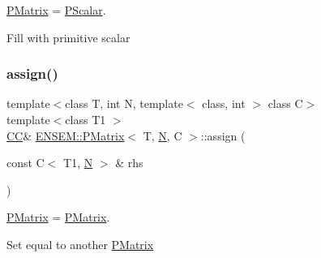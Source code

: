 \mbox{\hyperlink{classENSEM_1_1PMatrix}{P\+Matrix}} = \mbox{\hyperlink{classENSEM_1_1PScalar}{P\+Scalar}}. 

Fill with primitive scalar \mbox{\label{classENSEM_1_1PMatrix_ac3c0e489c8c8011edc4ea93477176b84}} 
\subsubsection{\texorpdfstring{assign()}{assign()}\hspace{0.1cm}{\footnotesize\ttfamily [5/6]}}
{\footnotesize\ttfamily template$<$class T, int N, template$<$ class, int $>$ class C$>$ \\
template$<$class T1 $>$ \\
\mbox{\hyperlink{classENSEM_1_1PMatrix_a744bac549029029effe32dc1705660ec}{CC}}\& \mbox{\hyperlink{classENSEM_1_1PMatrix}{E\+N\+S\+E\+M\+::\+P\+Matrix}}$<$ T, \mbox{\hyperlink{operator__name__util_8cc_a7722c8ecbb62d99aee7ce68b1752f337}{N}}, C $>$\+::assign (\begin{DoxyParamCaption}\item[{const C$<$ T1, \mbox{\hyperlink{operator__name__util_8cc_a7722c8ecbb62d99aee7ce68b1752f337}{N}} $>$ \&}]{rhs }\end{DoxyParamCaption})\hspace{0.3cm}{\ttfamily [inline]}}



\mbox{\hyperlink{classENSEM_1_1PMatrix}{P\+Matrix}} = \mbox{\hyperlink{classENSEM_1_1PMatrix}{P\+Matrix}}. 

Set equal to another \mbox{\hyperlink{classENSEM_1_1PMatrix}{P\+Matrix}} \mbox{\label{classENSEM_1_1PMatrix_ac3c0e489c8c8011edc4ea93477176b84}} 
